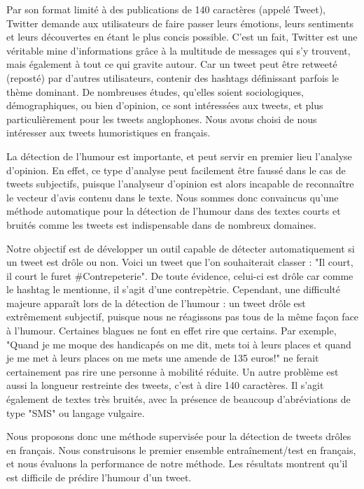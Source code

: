 \documentclass[10pt,a4paper,twoside]{article}
\begin{document}
Par son format limité à des publications de 140 caractères (appelé Tweet), Twitter demande aux utilisateurs de faire passer leurs émotions, leurs sentiments et leurs découvertes en étant le plus concis possible. C’est un fait, Twitter est une véritable mine d’informations grâce à la multitude de messages qui s'y trouvent, mais également à tout ce qui gravite autour. Car un tweet peut être retweeté (reposté) par d'autres utilisateurs, contenir des hashtags définissant parfois le thème dominant. De nombreuses études, qu'elles soient sociologiques, démographiques, ou bien d'opinion, ce sont intéressées aux tweets, et plus particulièrement pour les tweets anglophones. Nous avons choisi de nous intéresser aux tweets humoristiques en français.

La détection de l'humour est importante, et peut servir en premier lieu l'analyse d'opinion. En effet, ce type d'analyse peut facilement être faussé dans le cas de tweets subjectifs, puisque l'analyseur d'opinion est alors incapable de reconnaître le vecteur d'avis contenu dans le texte. Nous sommes donc convaincus qu'une méthode automatique pour la détection de l'humour dans des textes courts et bruités comme les tweets est indispensable dans de nombreux domaines. 

Notre objectif est de développer un outil capable de détecter automatiquement si un tweet est drôle ou non. Voici un tweet que l’on souhaiterait classer : "Il court, il court le furet \#Contrepeterie".  De toute évidence, celui-ci est drôle car comme le hashtag le mentionne, il s'agit d'une contrepètrie. Cependant, une difficulté majeure apparaît lors de la détection de l'humour : un tweet drôle est extrêmement subjectif, puisque nous ne réagissons pas tous de la même façon face à l'humour. Certaines blagues ne font en effet rire que certains. Par exemple, "Quand je me moque des handicapés on me dit, mets toi à leurs places et quand je me met à leurs places on me mets une amende de 135 euros!" ne ferait certainement pas rire une personne à mobilité réduite. Un autre problème est aussi la longueur restreinte des tweets, c'est à dire 140 caractères. Il s'agit également de textes très bruités, avec la présence de beaucoup d'abréviations de type "SMS" ou langage vulgaire.

Nous proposons donc une méthode supervisée pour la détection de tweets drôles en français. Nous construisons le premier ensemble entraînement/test en français, et nous évaluons la performance de notre méthode. Les résultats montrent qu'il est difficile de prédire l'humour d'un tweet.
\end{document}
